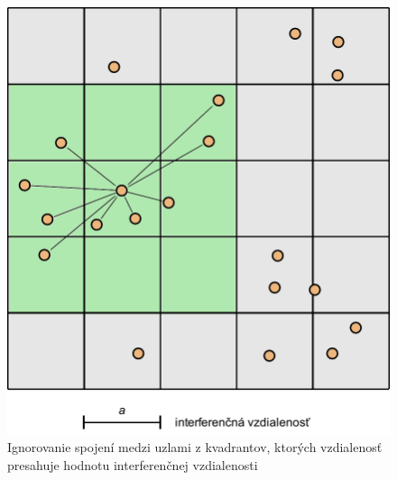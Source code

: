 \begin{figure}[htbp]
\begin{center}
\includegraphics[width=120mm]{figures/channelcontrol_areas}
\caption{Ignorovanie spojení medzi uzlami z kvadrantov, ktorých vzdialenosť presahuje hodnotu interferenčnej vzdialenosti}
\label{fig:channelcontrol_areas}
\end{center}
\end{figure}
